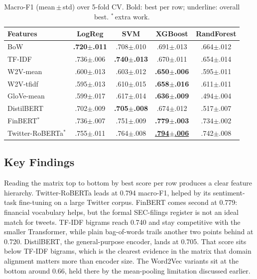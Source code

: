 \documentclass[12pt,a4paper]{article}
\begin{document}
\begin{table}[!htbp]
\centering
\small
\begin{tabular}{l|cccc}
\toprule
\textbf{Features} & \textbf{LogReg} & \textbf{SVM} & \textbf{XGBoost} & \textbf{RandForest} \\
\midrule
BoW              & \textbf{.720$\pm$.011} & .708$\pm$.010 & .691$\pm$.013 & .664$\pm$.012 \\
TF-IDF           & .736$\pm$.006 & \textbf{.740$\pm$.013} & .670$\pm$.011 & .654$\pm$.014 \\
W2V-mean         & .600$\pm$.013 & .603$\pm$.012 & \textbf{.650$\pm$.006} & .595$\pm$.011 \\
W2V-tfidf        & .595$\pm$.013 & .610$\pm$.015 & \textbf{.658$\pm$.016} & .611$\pm$.011 \\
GloVe-mean       & .599$\pm$.017 & .617$\pm$.014 & \textbf{.636$\pm$.009} & .494$\pm$.004 \\
DistilBERT       & .702$\pm$.009 & \textbf{.705$\pm$.008} & .674$\pm$.012 & .517$\pm$.007 \\
FinBERT$^{*}$         & .736$\pm$.007 & .751$\pm$.009 & \textbf{.779$\pm$.003} & .734$\pm$.002 \\
Twitter-RoBERTa$^{*}$ & .755$\pm$.011 & .764$\pm$.008 & \underline{\textbf{.794$\pm$.006}} & .742$\pm$.008 \\
\bottomrule
\end{tabular}
\caption{Macro-F1 (mean\,$\pm$\,std) over 5-fold CV. Bold: best per row; underline: overall best. $^{*}$\,extra work.}
\label{tab:results}
\end{table}

\subsection{Key Findings}

Reading the matrix top to bottom by best score per row produces a clear feature hierarchy. Twitter-RoBERTa leads at 0.794 macro-F1, helped by its sentiment-task fine-tuning on a large Twitter corpus. FinBERT comes second at 0.779: financial vocabulary helps, but the formal SEC-filings register is not an ideal match for tweets. TF-IDF bigrams reach 0.740 and stay competitive with the smaller Transformer, while plain bag-of-words trails another two points behind at 0.720. DistilBERT, the general-purpose encoder, lands at 0.705. That score sits below TF-IDF bigrams, which is the clearest evidence in the matrix that domain alignment matters more than encoder size. The Word2Vec variants sit at the bottom around 0.66, held there by the mean-pooling limitation discussed earlier.
\end{document}
